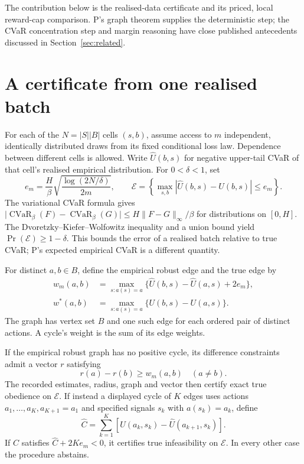 \documentclass{article}
\begin{document}
The contribution below is the realised-data certificate and its priced,
local reward-cap comparison. P's graph theorem supplies the deterministic
step; the CVaR concentration step and margin reasoning have close published
antecedents discussed in Section~\ref{sec:related}.

\section{A certificate from one realised batch}

For each of the \(N=|S||B|\) cells \((s,b)\), assume access to \(m\)
independent, identically distributed draws from its fixed conditional loss
law. Dependence between different cells is allowed. Write
\(\widehat U(b,s)\) for negative upper-tail CVaR of that cell's realised
empirical distribution. For \(0<\delta<1\), set
\[
e_m=\frac{H}{\beta}
\sqrt{\frac{\log(2N/\delta)}{2m}},\qquad
\mathcal E=\left\{
\max_{s,b}|\widehat U(b,s)-U(b,s)|\leq e_m
\right\}.
\]
The variational CVaR formula gives
\(\lvert\operatorname{CVaR}_{\beta}(F)
-\operatorname{CVaR}_{\beta}(G)\rvert
\leq H\|F-G\|_{\infty}/\beta\) for distributions on \([0,H]\).
The Dvoretzky--Kiefer--Wolfowitz inequality and a union bound yield
\(\Pr(\mathcal E)\geq1-\delta\). This bounds the error of a realised
batch relative to true CVaR; P's expected empirical CVaR is a different
quantity.

For distinct \(a,b\in B\), define the empirical robust edge and the true
edge by
\[
\begin{aligned}
w_m(a,b)&=\max_{s:a(s)=a}
\{\widehat U(b,s)-\widehat U(a,s)+2e_m\},\\
w^*(a,b)&=\max_{s:a(s)=a}
\{U(b,s)-U(a,s)\}.
\end{aligned}
\]
The graph has vertex set \(B\) and one such edge for each ordered pair of
distinct actions. A cycle's weight is the sum of its edge weights.

\begin{theorem}\label{thm:certificate}
If the empirical robust graph has no positive cycle, its difference
constraints admit a vector \(r\) satisfying
\[
r(a)-r(b)\geq w_m(a,b)\quad(a\ne b).
\]
The recorded estimates, radius, graph and vector then certify exact true
obedience on \(\mathcal E\). If instead a displayed cycle of \(K\) edges
uses actions \(a_1,\ldots,a_K,a_{K+1}=a_1\) and specified signals
\(s_k\) with \(a(s_k)=a_k\), define
\[\widehat C=\sum_{k=1}^K[\widehat U(a_k,s_k)-\widehat U(a_{k+1},s_k)].\]
If \(\widehat C\) satisfies
\(\widehat C+2Ke_m<0\), it certifies true infeasibility on
\(\mathcal E\). In every other case the procedure abstains.
\end{theorem}
\end{document}

